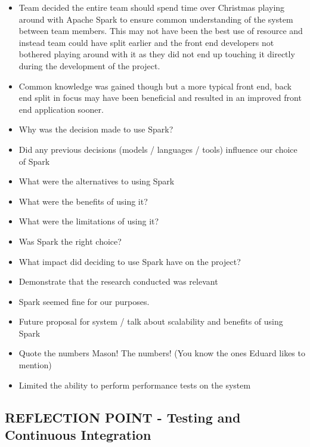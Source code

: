 \documentclass{l3proj}
\begin{document}


\begin{itemize}
\item Team decided the entire team should spend time over Christmas playing around with Apache Spark to ensure common understanding of the system between team members. This may not have been the best use of resource and instead team could have split earlier and the front end developers not bothered playing around with it as they did not end up touching it directly during the development of the project. 
\item Common knowledge was gained though but a more typical front end, back end split in focus may have been beneficial and resulted in an improved front end application sooner.
\item Why was the decision made to use Spark?
\item Did any previous decisions (models / languages / tools) influence our choice of Spark
\item What were the alternatives to using Spark
\item What were the benefits of using it?
\item What were the limitations of using it?
\item Was Spark the right choice?
\item What impact did deciding to use Spark have on the project?
\item Demonstrate that the research conducted was relevant
\item Spark seemed fine for our purposes.
\item Future proposal for system / talk about scalability and benefits of using Spark
\item Quote the numbers Mason! The numbers! (You know the ones Eduard likes to mention)
\item Limited the ability to perform performance tests on the system
\end{itemize}


\subsection{REFLECTION POINT - Testing and Continuous Integration}
\label{testing}
\end{document}
